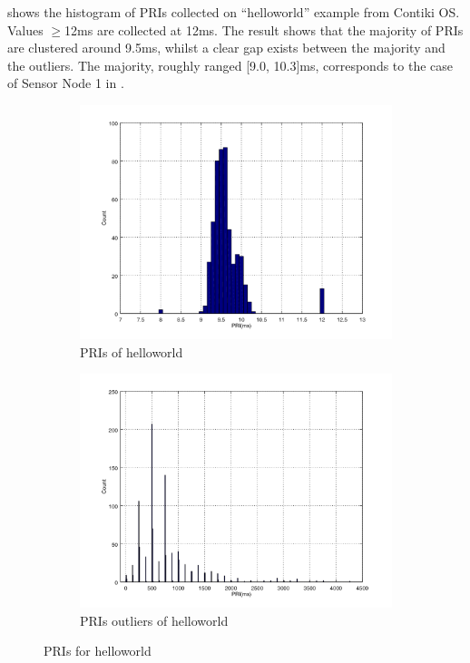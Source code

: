  shows the histogram of PRIs collected on ``helloworld'' example from Contiki OS. Values $\geq$12ms are collected at 12ms. The result shows that the majority of PRIs are clustered around 9.5ms, whilst a clear gap exists between the majority and the outliers. The majority, roughly ranged [9.0, 10.3]ms, corresponds to the case of Sensor Node 1 in . 

\begin{figure}[!h]
	\centering
	\begin{subfigure}{0.45\textwidth}
		\includegraphics[width=\textwidth]{fig/helloworld_cc2538.png}
		\caption{PRIs of helloworld\label{HelloworldPri}}
	\end{subfigure}
	\begin{subfigure}{0.45\textwidth}
		\includegraphics[width=\textwidth]{fig/helloworld_cc2538_outlier.png}
		\caption{PRIs outliers of helloworld\label{HelloworldPriOutliers}}
	\end{subfigure}
	\caption{PRIs for helloworld}
\end{figure}

